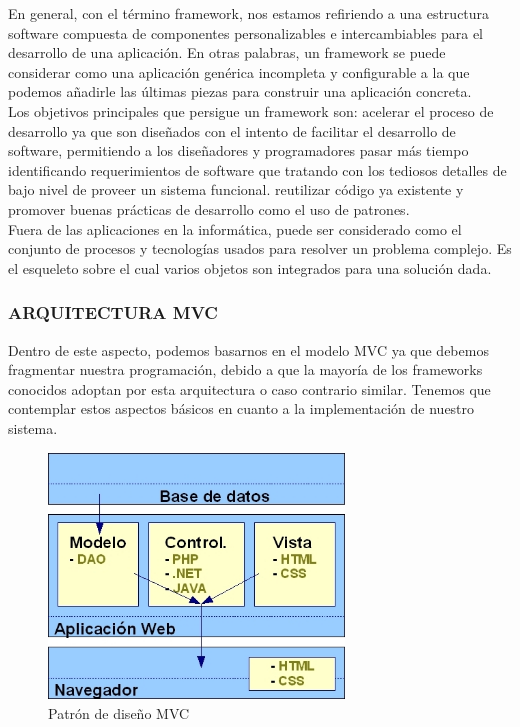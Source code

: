 En general, con el término framework, nos estamos refiriendo a una estructura
software compuesta de componentes personalizables e intercambiables para el
desarrollo de una aplicación. En otras palabras, un framework se puede considerar como
una aplicación genérica incompleta y configurable a la que podemos añadirle las últimas
piezas para construir una aplicación concreta.\\

Los objetivos principales que persigue un framework son: 
acelerar el proceso de desarrollo ya que son diseñados con el intento de facilitar el desarrollo de software, permitiendo a los diseñadores y programadores pasar más tiempo identificando requerimientos de software que tratando con los tediosos detalles de bajo nivel de proveer un sistema funcional.
reutilizar código ya existente y promover buenas prácticas de desarrollo como el uso de patrones.\\

Fuera de las aplicaciones en la informática, puede ser considerado como el conjunto de procesos y tecnologías usados para resolver un problema complejo. Es el esqueleto sobre el cual varios objetos son integrados para una solución dada.

\subsubsection{ARQUITECTURA MVC}

Dentro de este aspecto, podemos basarnos en el modelo MVC ya que debemos fragmentar nuestra programación, debido a que la mayoría de los frameworks conocidos adoptan por esta arquitectura o caso contrario similar. Tenemos que contemplar estos aspectos básicos en cuanto a la implementación de nuestro sistema.\\
\begin{figure}[ht]
\centering
\includegraphics[width=0.7\textwidth]{imagenes/mvc.jpg}%
\caption{Patrón de diseño MVC}
\label{contexto:figura}
\end{figure}

